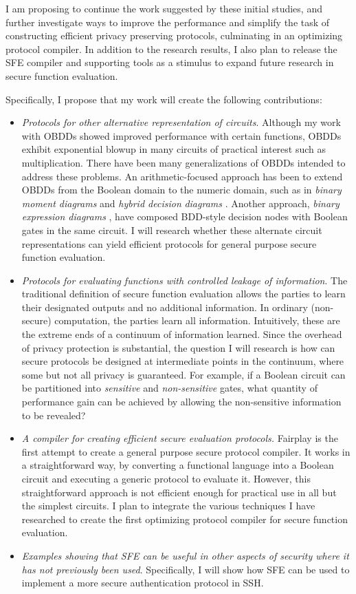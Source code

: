 I am proposing to continue the work suggested by these initial studies,
and further investigate ways to improve the performance and simplify
the task of constructing efficient privacy preserving protocols, culminating
in an optimizing protocol compiler. In addition to the research results,
I also plan to release the SFE compiler and supporting tools as a
stimulus to expand future research in secure function evaluation.

Specifically, I propose that my work will create the following contributions:
\begin{itemize}
\item \emph{Protocols for other alternative representation of circuits}.
Although my work with OBDDs showed improved performance with certain
functions, OBDDs exhibit exponential blowup in many circuits of practical
interest such as multiplication. There have been many generalizations
of OBDDs intended to address these problems. An arithmetic-focused
approach has been to extend OBDDs from the Boolean domain to the numeric
domain, such as in \emph{binary moment diagrams} \cite{bryant94verification}
and \emph{hybrid decision} \emph{diagrams} \cite{clarke95hybrid}.
Another approach, \emph{binary expression diagrams} \cite{BoolExprDiagram},
have composed BDD-style decision nodes with Boolean gates in the same
circuit. I will research whether these alternate circuit representations
can yield efficient protocols for general purpose secure function
evaluation.
\item \emph{Protocols for evaluating functions with controlled leakage of
information}. The traditional definition of secure function evaluation
allows the parties to learn their designated outputs and no additional
information. In ordinary (non-secure) computation, the parties learn
all information. Intuitively, these are the extreme ends of a continuum
of information learned. Since the overhead of privacy protection is
substantial, the question I will research is how can secure protocols
be designed at intermediate points in the continuum, where some but
not all privacy is guaranteed. For example, if a Boolean circuit can
be partitioned into \emph{sensitive} and \emph{non-sensitive} gates,
what quantity of performance gain can be achieved by allowing the
non-sensitive information to be revealed?
\item \emph{A compiler for creating efficient secure evaluation protocols.}
Fairplay \cite{Fairplay} is the first attempt to create a general
purpose secure protocol compiler. It works in a straightforward way,
by converting a functional language into a Boolean circuit and executing
a generic protocol to evaluate it. However, this straightforward approach
is not efficient enough for practical use in all but the simplest
circuits. I plan to integrate the various techniques I have researched
to create the first optimizing protocol compiler for secure function
evaluation.
\item \emph{Examples showing that SFE can be useful in other aspects of
security where it has not previously been used}. Specifically, I will
show how SFE can be used to implement a more secure authentication
protocol in SSH.
\end{itemize}

